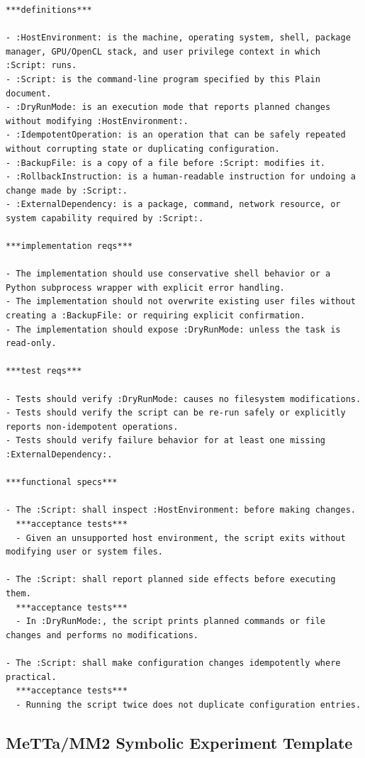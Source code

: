 \documentclass[11pt]{article}
\begin{document}
\begin{lstlisting}
***definitions***

- :HostEnvironment: is the machine, operating system, shell, package manager, GPU/OpenCL stack, and user privilege context in which :Script: runs.
- :Script: is the command-line program specified by this Plain document.
- :DryRunMode: is an execution mode that reports planned changes without modifying :HostEnvironment:.
- :IdempotentOperation: is an operation that can be safely repeated without corrupting state or duplicating configuration.
- :BackupFile: is a copy of a file before :Script: modifies it.
- :RollbackInstruction: is a human-readable instruction for undoing a change made by :Script:.
- :ExternalDependency: is a package, command, network resource, or system capability required by :Script:.

***implementation reqs***

- The implementation should use conservative shell behavior or a Python subprocess wrapper with explicit error handling.
- The implementation should not overwrite existing user files without creating a :BackupFile: or requiring explicit confirmation.
- The implementation should expose :DryRunMode: unless the task is read-only.

***test reqs***

- Tests should verify :DryRunMode: causes no filesystem modifications.
- Tests should verify the script can be re-run safely or explicitly reports non-idempotent operations.
- Tests should verify failure behavior for at least one missing :ExternalDependency:.

***functional specs***

- The :Script: shall inspect :HostEnvironment: before making changes.
  ***acceptance tests***
  - Given an unsupported host environment, the script exits without modifying user or system files.

- The :Script: shall report planned side effects before executing them.
  ***acceptance tests***
  - In :DryRunMode:, the script prints planned commands or file changes and performs no modifications.

- The :Script: shall make configuration changes idempotently where practical.
  ***acceptance tests***
  - Running the script twice does not duplicate configuration entries.
\end{lstlisting}

\subsection{MeTTa/MM2 Symbolic Experiment Template}
\end{document}
